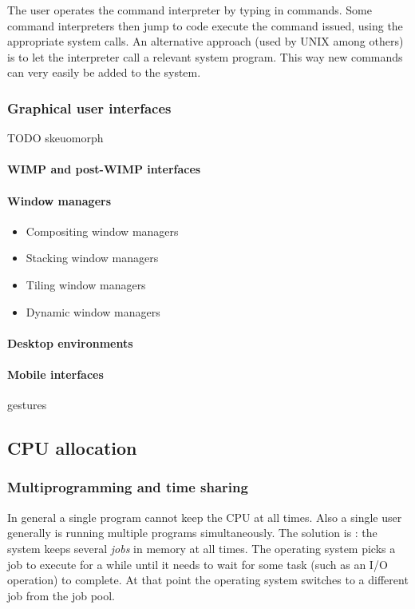 The user operates the command interpreter by typing in commands. Some command interpreters then jump to code execute the command issued, using the appropriate system calls. An alternative approach (used by UNIX among others) is to let the interpreter call a relevant system program. This way new commands can very easily be added to the system.

\subsubsection{Graphical user interfaces}
TODO skeuomorph
\paragraph{WIMP and post-WIMP interfaces}
\paragraph{Window managers}
\begin{itemize}
\item Compositing window managers
\item Stacking window managers
\item Tiling window managers
\item Dynamic window managers
\end{itemize}
\paragraph{Desktop environments}
\paragraph{Mobile interfaces}
gestures

\subsection{CPU allocation}
\subsubsection{Multiprogramming and time sharing}
In general a single program cannot keep the CPU at all times. Also a single user generally is running multiple programs simultaneously. The solution is : the system keeps several \textit{jobs} in memory at all times. The operating system picks a job to execute for a while until it needs to wait for some task (such as an I/O operation) to complete. At that point the operating system switches to a different job from the job pool.


